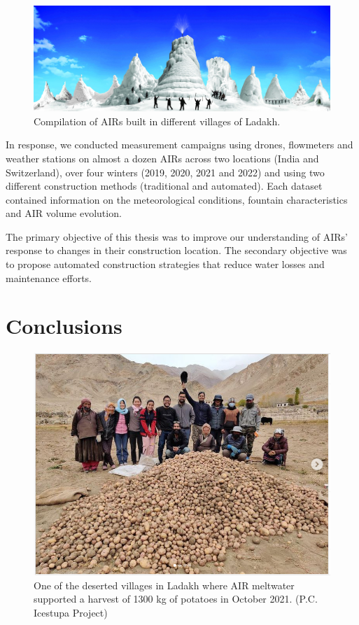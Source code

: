 \begin{figure}[htb]
	\includegraphics[width=\textwidth]{figs/AIRs_Ladakh}
	\caption{Compilation of AIRs built in different villages of Ladakh.}
	\label{fig:airs_ladakh}
\end{figure}


In response, we conducted measurement campaigns using drones, flowmeters and weather stations on almost a dozen
AIRs across two locations (India and Switzerland), over four winters (2019, 2020, 2021 and 2022) and using two
different construction methods (traditional and automated). Each dataset contained information on the
meteorological conditions, fountain characteristics and AIR volume evolution.

The primary objective of this thesis was to improve our understanding of AIRs' response to changes in
their construction location. The secondary objective was to propose automated construction strategies that reduce
water losses and maintenance efforts.

\section{Conclusions}

\begin{figure}[htb]
	\includegraphics[width=\textwidth]{figs/Kullum_potatoes}
	\caption{One of the deserted villages in Ladakh where AIR meltwater supported a harvest of 1300 kg of
		potatoes in October 2021. (P.C. Icestupa Project)}
	\label{fig:kullum_potatoes}
\end{figure}

